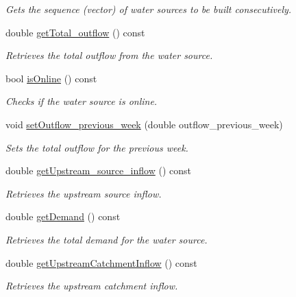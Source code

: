 \begin{DoxyCompactItemize}
\begin{DoxyCompactList}\small\item\em Gets the sequence (vector) of water sources to be built consecutively. \end{DoxyCompactList}\item 
double \mbox{\hyperlink{classWaterSource_a7678e05e3e73b927c0b47e3041d7415f}{get\+Total\+\_\+outflow}} () const
\begin{DoxyCompactList}\small\item\em Retrieves the total outflow from the water source. \end{DoxyCompactList}\item 
bool \mbox{\hyperlink{classWaterSource_a130fd661ff31c53115cca23e4e2f210a}{is\+Online}} () const
\begin{DoxyCompactList}\small\item\em Checks if the water source is online. \end{DoxyCompactList}\item 
void \mbox{\hyperlink{classWaterSource_ab53d376a425b8db603382ba27b52b1d4}{set\+Outflow\+\_\+previous\+\_\+week}} (double outflow\+\_\+previous\+\_\+week)
\begin{DoxyCompactList}\small\item\em Sets the total outflow for the previous week. \end{DoxyCompactList}\item 
double \mbox{\hyperlink{classWaterSource_ad7e60efd7395f8d3e674e602226e5ac1}{get\+Upstream\+\_\+source\+\_\+inflow}} () const
\begin{DoxyCompactList}\small\item\em Retrieves the upstream source inflow. \end{DoxyCompactList}\item 
double \mbox{\hyperlink{classWaterSource_ac57d6b292490333b5bc14233bce326ce}{get\+Demand}} () const
\begin{DoxyCompactList}\small\item\em Retrieves the total demand for the water source. \end{DoxyCompactList}\item 
double \mbox{\hyperlink{classWaterSource_afd2a153ba8f4ecaa9f8fa851d5a1727c}{get\+Upstream\+Catchment\+Inflow}} () const
\begin{DoxyCompactList}\small\item\em Retrieves the upstream catchment inflow. \end{DoxyCompactList}\item 

\end{DoxyCompactItemize}

